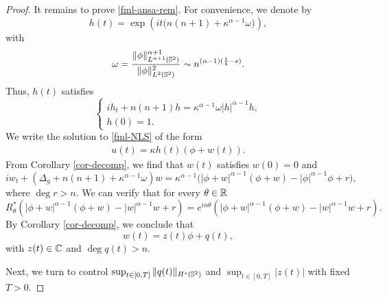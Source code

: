 \documentclass[11pt, reqno]{amsart}
\numberwithin{equation}{section}
\newcommand{\R}{\Bbb R}
\theoremstyle{definition}
\theoremstyle{remark}
\begin{document}
{\begin{proof}
It remains to prove \eqref{fml-ansa-rem}.  For convenience, we denote by
\begin{equation*}
h(t) = \exp(it\big( n(n+1)+\kappa^{\alpha-1}\omega \big)),
\end{equation*}
with
\begin{equation*}
\omega = \frac{\|\phi\|^{\alpha+1}_{L^{\alpha+1}(\Bbb S^2)}}{\|\phi\|^2_{L^2(\Bbb S^2)}} \sim n^{(\alpha-1)(\frac{1}{4}-s)}.
\end{equation*}
Thus, $h(t)$ satisfies
\begin{equation*}
\begin{cases}
ih_t + n(n+1) h = \kappa^{\alpha-1} \omega |h|^{\alpha-1}h,\\
h(0)=1.
\end{cases}
\end{equation*}
We write the solution to \eqref{fml-NLS} of the form 
\begin{align}\label{equivalent-1}
u(t) = \kappa h(t)(\phi + w(t)).
\end{align} From Corollary \ref{cor-decomp}, we find that $w(t)$ satisfies $w(0)=0$ and
\begin{equation}\label{fml-w-eq}
iw_t + (\Delta_g+n(n+1)+\kappa^{\alpha-1}\omega) w = \kappa^{\alpha-1}\big( |\phi+w|^{\alpha-1}(\phi+w)-|\phi|^{\alpha-1}\phi+r \big),
\end{equation}
where $\operatorname{deg}r > n$. We can verify that for every $\theta\in\R$
\begin{equation*}
R^*_\theta( |\phi+w|^{\alpha-1}(\phi+w)-|w|^{\alpha-1}w+r) =  e^{in\theta}(|\phi+w|^{\alpha-1}(\phi+w)-|w|^{\alpha-1}w+r).
\end{equation*}
By Corollary \ref{cor-decomp}, we conclude that
\begin{equation*}
w(t) = z(t)\phi+q(t),
\end{equation*}
with $z(t)\in\Bbb C$ and $\operatorname{deg}q(t) > n$. 
		
Next, we turn to control $\sup_{t\in[0,T]}\|q(t)\|_{H^s(\Bbb S^2)}$ and $\sup_{t\in[0,T]}|z(t)|$ with fixed $T>0$.
		

\end{proof}}
\end{document}
